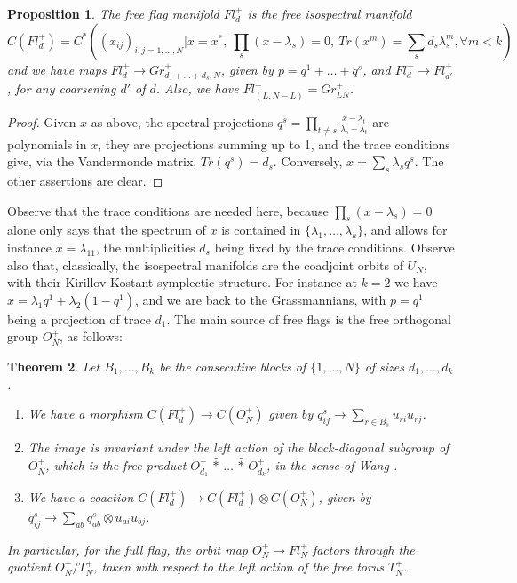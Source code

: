 \documentclass[11pt]{article}
\theoremstyle{plain}
\newtheorem{theorem}{Theorem}[section]
\newtheorem{proposition}[theorem]{Proposition}
\begin{document}
\begin{proposition}
\label{prop:isospectral}
The free flag manifold $Fl^+_d$ is the free isospectral manifold
$$C(Fl^+_d)=C^*\left((x_{ij})_{i,j=1,\ldots,N}\Big|x=x^*,\ \prod_s(x-\lambda_s)=0,\ Tr(x^m)=\sum_sd_s\lambda_s^m,\forall m<k\right)$$
and we have maps $Fl^+_d\to Gr^+_{d_1+\ldots+d_s,N}$, given by $p=q^1+\ldots+q^s$, and $Fl^+_d\to Fl^+_{d'}$, for any coarsening $d'$ of $d$. Also, we have $Fl^+_{(L,N-L)}=Gr^+_{LN}$.
\end{proposition}

\begin{proof}
Given $x$ as above, the spectral projections $q^s=\prod_{t\neq s}\frac{x-\lambda_t}{\lambda_s-\lambda_t}$ are polynomials in $x$, they are projections summing up to 1, and the trace conditions give, via the Vandermonde matrix, $Tr(q^s)=d_s$. Conversely, $x=\sum_s\lambda_sq^s$. The other assertions are clear.
\end{proof}

Observe that the trace conditions are needed here, because $\prod_s(x-\lambda_s)=0$ alone only says that the spectrum of $x$ is contained in $\{\lambda_1,\ldots,\lambda_k\}$, and allows for instance $x=\lambda_11$, the multiplicities $d_s$ being fixed by the trace conditions. Observe also that, classically, the isospectral manifolds are the coadjoint orbits of $U_N$, with their Kirillov-Kostant symplectic structure. For instance at $k=2$ we have $x=\lambda_1q^1+\lambda_2(1-q^1)$, and we are back to the Grassmannians, with $p=q^1$ being a projection of trace $d_1$. The main source of free flags is the free orthogonal group $O_N^+$, as follows:

\begin{theorem}
\label{thm:flagmaps}
Let $B_1,\ldots,B_k$ be the consecutive blocks of $\{1,\ldots,N\}$ of sizes $d_1,\ldots,d_k$.
\begin{enumerate}
\item We have a morphism $C(Fl^+_d)\to C(O_N^+)$ given by $q^s_{ij}\to\sum_{r\in B_s}u_{ri}u_{rj}$.

\item The image is invariant under the left action of the block-diagonal subgroup of $O_N^+$, which is the free product $O_{d_1}^+\,\widehat{*}\,\ldots\,\widehat{*}\,O_{d_k}^+$, in the sense of Wang \cite{wa1}.

\item We have a coaction $C(Fl^+_d)\to C(Fl^+_d)\otimes C(O_N^+)$, given by $q^s_{ij}\to\sum_{ab}q^s_{ab}\otimes u_{ai}u_{bj}$.
\end{enumerate}
In particular, for the full flag, the orbit map $O_N^+\to Fl^+_N$ factors through the quotient $O_N^+/T_N^+$, taken with respect to the left action of the free torus $T_N^+$.
\end{theorem}
\end{document}
